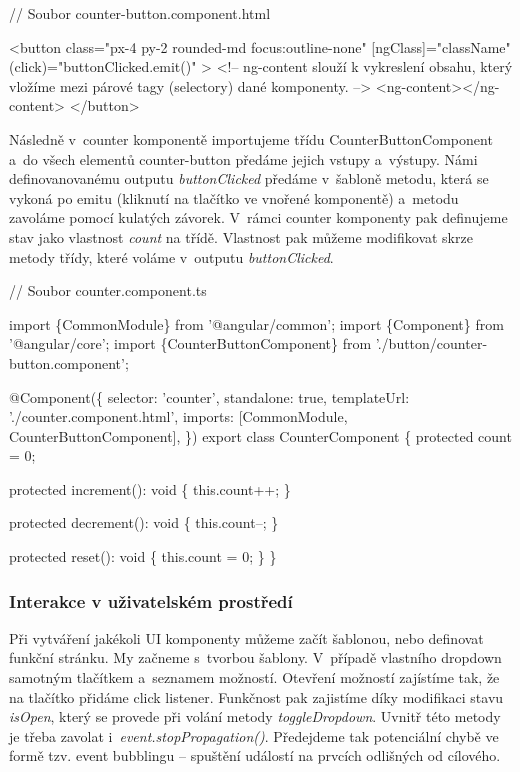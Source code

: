 \begin{prog}
// Soubor counter-button.component.html

<button
  class="px-4 py-2 rounded-md focus:outline-none"
  [ngClass]="className"
  (click)="buttonClicked.emit()"
>
  <!-- ng-content slouží k vykreslení obsahu, který vložíme
    mezi párové tagy (selectory) dané komponenty. -->
  <ng-content></ng-content>
</button>
\end{prog}

Následně v~counter komponentě importujeme třídu CounterButtonComponent a~do všech elementů counter-button předáme jejich vstupy a~výstupy. 
Námi definovanovanému outputu \emph{buttonClicked} předáme v~šabloně metodu, která se vykoná po emitu (kliknutí na tlačítko ve vnořené komponentě) a~metodu zavoláme pomocí kulatých závorek. 
V~rámci counter komponenty pak definujeme stav jako vlastnost \emph{count} na třídě. Vlastnost pak můžeme modifikovat skrze metody třídy, které voláme v~outputu \emph{buttonClicked}.

\begin{prog}
// Soubor counter.component.ts

import \{CommonModule\} from '@angular/common';
import \{Component\} from '@angular/core';
import \{CounterButtonComponent\} from './button/counter-button.component';

@Component(\{
  selector: 'counter',
  standalone: true,
  templateUrl: './counter.component.html',
  imports: [CommonModule, CounterButtonComponent],
\})
export class CounterComponent \{
  protected count = 0;

  protected increment(): void \{
    this.count++;
  \}

  protected decrement(): void \{
    this.count--;
  \}

  protected reset(): void \{
    this.count = 0;
  \}
\}
\end{prog}

\subsubsection*{Interakce v uživatelském prostředí}

Při vytváření jakékoli UI komponenty můžeme začít šablonou, nebo definovat funkční stránku. My začneme s~tvorbou šablony. V~případě vlastního dropdown samotným tlačítkem a~seznamem možností. 
Otevření možností zajístíme tak, že na tlačítko přidáme click listener. Funkčnost pak zajistíme díky modifikaci stavu \emph{isOpen}, který se provede při volání metody \emph{toggleDropdown}. 
Uvnitř této metody je třeba zavolat i~\emph{event.stopPropagation()}. Předejdeme tak potenciální chybě ve formě tzv. event bubblingu -- spuštění událostí na prvcích odlišných od cílového.

